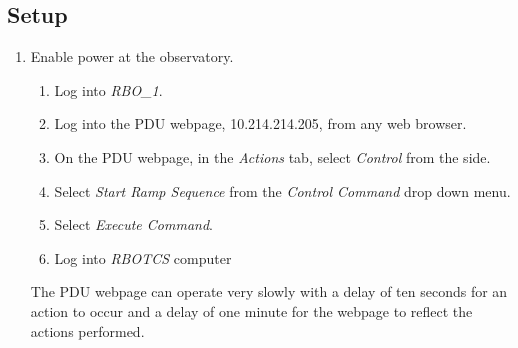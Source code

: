\documentclass[letterpaper,12pt]{article}
\begin{document}
	\subsection{Setup}
	\begin{enumerate}
		\item Enable power at the observatory.
		\begin{enumerate}
			\item Log into \textit{RBO\_1}.
			\item Log into the PDU webpage, 10.214.214.205, from any web browser.
			\item On the PDU webpage, in the \textit{Actions} tab, select \textit{Control} from the side.
			\item Select \textit{Start Ramp Sequence} from the \textit{Control Command} drop down menu.
			\item Select \textit{Execute Command}.
			\item Log into \textit{RBOTCS} computer
		\end{enumerate}
		The PDU webpage can operate very slowly with a delay of ten seconds for an action to occur and a delay of one minute for the webpage to reflect the actions performed.
		

\end{enumerate}
\end{document}
